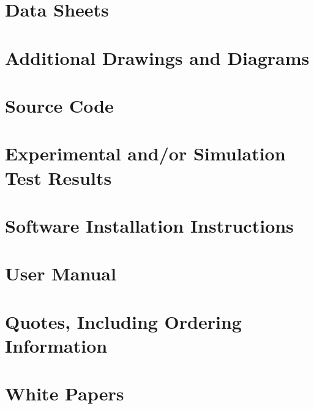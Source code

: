 \documentclass{article}
\begin{document}
\section{Data Sheets}
\section{Additional Drawings and Diagrams}
\section{Source Code} 
\section{Experimental and/or Simulation Test Results} 
\section{Software Installation Instructions} 
\section{User Manual} 
\section{Quotes, Including Ordering Information} 
\section{White Papers} 
\end{document}
